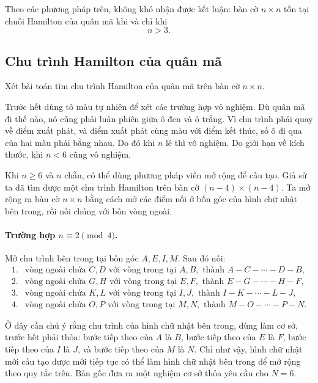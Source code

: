 \documentclass[11pt]{article}
\begin{document}
Theo các phương pháp trên, không khó nhận được kết luận: bàn cờ \(n\times n\)
tồn tại chuỗi Hamilton của quân mã khi và chỉ khi
\[
  n>3.
\]

\subsection{Chu trình Hamilton của quân mã}

Xét bài toán tìm chu trình Hamilton của quân mã trên bàn cờ \(n\times n\).

Trước hết dùng tô màu tự nhiên để xét các trường hợp vô nghiệm. Dù quân mã đi
thế nào, nó cũng phải luân phiên giữa ô đen và ô trắng. Vì chu trình phải quay
về điểm xuất phát, và điểm xuất phát cùng màu với điểm kết thúc, số ô đi qua
của hai màu phải bằng nhau. Do đó khi \(n\) lẻ thì vô nghiệm. Do giới hạn về
kích thước, khi \(n<6\) cũng vô nghiệm.

Khi \(n\ge 6\) và \(n\) chẵn, có thể dùng phương pháp viền mở rộng để cấu
tạo. Giả sử ta đã tìm được một chu trình Hamilton trên bàn cờ
\((n-4)\times(n-4)\). Ta mở rộng ra bàn cờ \(n\times n\) bằng cách mở các
điểm nối ở bốn góc của hình chữ nhật bên trong, rồi nối chúng với bốn vòng
ngoài.

\paragraph{Trường hợp \(n\equiv2\pmod 4\).}
Mở chu trình bên trong tại bốn góc \(A,E,I,M\). Sau đó nối:
\[
\begin{array}{ll}
  1. & \text{vòng ngoài chứa } C,D \text{ với vòng trong tại } A,B,
       \text{ thành } A-C-\cdots-D-B,\\
  2. & \text{vòng ngoài chứa } G,H \text{ với vòng trong tại } E,F,
       \text{ thành } E-G-\cdots-H-F,\\
  3. & \text{vòng ngoài chứa } K,L \text{ với vòng trong tại } I,J,
       \text{ thành } I-K-\cdots-L-J,\\
  4. & \text{vòng ngoài chứa } O,P \text{ với vòng trong tại } M,N,
       \text{ thành } M-O-\cdots-P-N.
\end{array}
\]

Ở đây cần chú ý rằng chu trình của hình chữ nhật bên trong, dùng làm cơ sở,
trước hết phải thỏa: bước tiếp theo của \(A\) là \(B\), bước tiếp theo của
\(E\) là \(F\), bước tiếp theo của \(I\) là \(J\), và bước tiếp theo của \(M\)
là \(N\). Chỉ như vậy, hình chữ nhật mới cấu tạo được mới tiếp tục có thể làm
hình chữ nhật bên trong để mở rộng theo quy tắc trên. Bản gốc đưa ra một
nghiệm cơ sở thỏa yêu cầu cho \(N=6\).
\end{document}
